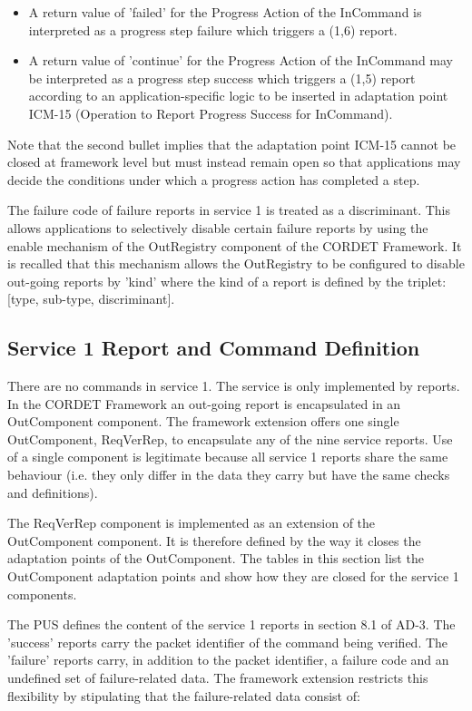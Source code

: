 \documentclass{pnp_article}
\begin{document}
\begin{itemize}
\item A return value of 'failed' for the Progress Action of the InCommand is interpreted as a progress step failure which triggers a (1,6) report. 
\item A return value of 'continue' for the Progress Action of the InCommand may be interpreted as a progress step success which triggers a (1,5) report according to an application-specific logic to be inserted in adaptation point ICM-15 (Operation to Report Progress Success for InCommand). 
\end{itemize}

Note that the second bullet implies that the adaptation point ICM-15 cannot be closed at framework level but must instead remain open so that applications may decide the conditions under which a progress action has completed a step.

The failure code of failure reports in service 1 is treated as a discriminant. This allows applications to selectively disable certain failure reports by using the enable mechanism of the OutRegistry component of the CORDET Framework. It is recalled that this mechanism allows the OutRegistry to be configured to disable out-going reports by 'kind' where the kind of a report is defined by the triplet: [type, sub-type, discriminant]. 


\subsection{Service 1 Report and Command Definition}\label{sec:serv1RepDef}
There are no commands in service 1. The service is only implemented by reports. In the CORDET Framework an out-going report is encapsulated in an OutComponent component. The framework extension offers one single OutComponent, ReqVerRep, to encapsulate any of the nine service reports. Use of a single component is legitimate because all service 1 reports share the same behaviour (i.e. they only differ in the data they carry but have the same checks and definitions).

The ReqVerRep component is implemented as an extension of the OutComponent component. It is therefore defined by the way it closes the adaptation points of the OutComponent. The tables in this section list the OutComponent adaptation points and show how they are closed for the service 1 components.

The PUS defines the content of the service 1 reports in section 8.1 of AD-3. The 'success' reports carry the packet identifier of the command being verified. The 'failure' reports carry, in addition to the packet identifier, a failure code and an undefined set of failure-related data. The framework extension restricts this flexibility by stipulating that the failure-related data consist of: 
\end{document}
